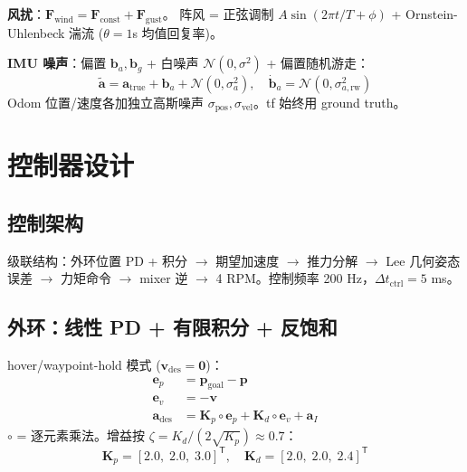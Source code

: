 \documentclass[12pt,a4paper]{article}
\begin{document}
\textbf{风扰}：$\mathbf{F}_{\text{wind}} = \mathbf{F}_{\text{const}} + \mathbf{F}_{\text{gust}}$。
阵风 = 正弦调制 $A\sin(2\pi t/T + \phi)$ + Ornstein-Uhlenbeck 湍流 ($\theta=1$s 均值回复率)。

\textbf{IMU 噪声}：偏置 $\mathbf{b}_a,\mathbf{b}_g$ + 白噪声 $\mathcal{N}(0,\sigma^2)$ + 偏置随机游走：
\begin{equation}
  \tilde{\mathbf{a}} = \mathbf{a}_{\text{true}} + \mathbf{b}_a + \mathcal{N}(0,\sigma_a^2),\quad
  \dot{\mathbf{b}}_a = \mathcal{N}(0,\sigma_{a,\text{rw}}^2)
\end{equation}
Odom 位置/速度各加独立高斯噪声 $\sigma_{\text{pos}}, \sigma_{\text{vel}}$。tf 始终用 ground truth。


\section{控制器设计}

\subsection{控制架构}

级联结构：外环位置 PD + 积分 $\to$ 期望加速度 $\to$ 推力分解 $\to$ Lee 几何姿态误差 $\to$ 力矩命令 $\to$ mixer 逆 $\to$ 4 RPM。控制频率 200 Hz，$\Delta t_{\text{ctrl}} = 5$ ms。

\subsection{外环：线性 PD + 有限积分 + 反饱和}

hover/waypoint-hold 模式 ($\mathbf{v}_{\text{des}} = \mathbf{0}$)：
\begin{align}
  \mathbf{e}_p &= \mathbf{p}_{\text{goal}} - \mathbf{p} \label{eq:ep} \\
  \mathbf{e}_v &= -\mathbf{v} \label{eq:ev} \\
  \mathbf{a}_{\text{des}} &= \mathbf{K}_p \circ \mathbf{e}_p
                           + \mathbf{K}_d \circ \mathbf{e}_v
                           + \mathbf{a}_I \label{eq:ades}
\end{align}
$\circ$ = 逐元素乘法。增益按 $\zeta = K_d/(2\sqrt{K_p}) \approx 0.7$：
\begin{equation}
  \mathbf{K}_p = [2.0,\; 2.0,\; 3.0]^{\mathsf{T}},\quad
  \mathbf{K}_d = [2.0,\; 2.0,\; 2.4]^{\mathsf{T}}
\end{equation}
\end{document}
